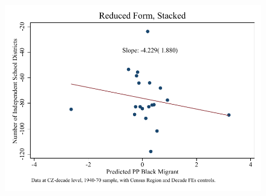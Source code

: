 \documentclass{article}
\begin{document}
\begin{figure}
\centering
\includegraphics{figures/simplefigs/stacked_schdist_ind_raw_C3_full_rf.pdf}
\end{figure}
\clearpage
\end{document}
